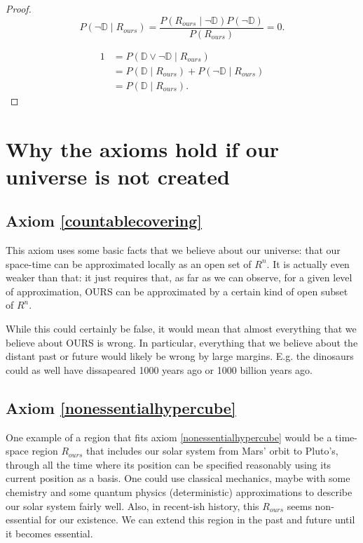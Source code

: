 \documentclass[a4paper
,draft
]{article}
\def\designer{\mathbb{D}}
\begin{document}
\begin{proof}
$$P(\lnot \designer \mid R_{ours}) = \frac{P(R_{ours} \mid \lnot \designer) P(\lnot \designer)}{P(R_{ours})} = 0.$$

\begin{equation*}
\begin{split}
1 &= P(\designer \lor \lnot \designer \mid R_{ours}) \\
  &= P(\designer \mid R_{ours}) + P(\lnot \designer \mid R_{ours}) \\
  &= P(\designer \mid R_{ours}).
\end{split}
\end{equation*}

\end{proof}

\section{Why the axioms hold if our universe is not created}

\subsection{Axiom \ref{countablecovering}}

This axiom uses some basic facts that we believe about our universe: that our space-time can be approximated locally as an open set of $R^n$. It is actually even weaker than that: it just requires that, as far as we can observe, for a given level of approximation, OURS can be approximated by a certain kind of open subset of $R^n$.

While this could certainly be false, it would mean that almost everything that we believe about OURS is wrong. In particular, everything that we believe about the distant past or future would likely be wrong by large margins. E.g. the dinosaurs could as well have dissapeared 1000 years ago or 1000 billion years ago.

\subsection{Axiom \ref{nonessentialhypercube}}

One example of a region that fits axiom \ref{nonessentialhypercube} would be a time-space region $R_{ours}$ that includes our solar system from Mars' orbit to Pluto's, through all the time where its position can be specified reasonably using its current position as a basis. One could use classical mechanics, maybe with some chemistry and some quantum physics (deterministic) approximations to describe our solar system fairly well. Also, in recent-ish history, this $R_{ours}$ seems non-essential for our existence. We can extend this region in the past and future until it becomes essential.
\end{document}
